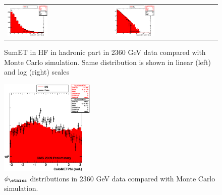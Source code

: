 \begin{figure}[h!]
 \centering
 \begin{tabular}{ll}
  \includegraphics[width=0.40\textwidth]{plots_DataVsMC_MB_2360GeV/h_caloSumetHadHF_lin.eps} &
  \includegraphics[width=0.40\textwidth]{plots_DataVsMC_MB_2360GeV/h_caloSumetHadHF.eps} \\
 \end{tabular}
 \caption{SumET in HF in hadronic part in 2360 GeV data compared
   with Monte Carlo simulation. Same distribution is shown in linear (left) and log (right) scales
          \label{fig:DataVsMC_MB_2360_10}}
\end{figure}

\begin{figure}[h!]
 \centering
  \includegraphics[width=0.40\textwidth]{plots_DataVsMC_MB_2360GeV/h_calometPhi.eps}
 \caption{$\phi_{\etmiss}$ distributions in 2360 GeV data compared
   with Monte Carlo simulation.
          \label{fig:DataVsMC_MB_2360_11}}
\end{figure}

